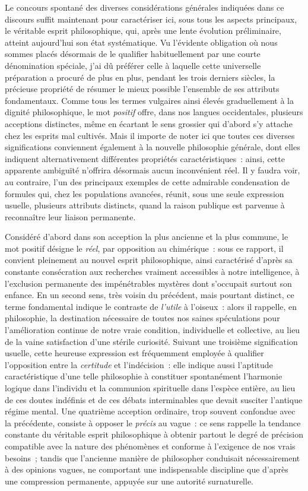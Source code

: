 \documentclass[french,twoside]{book} %
\begin{document}
Le concours spontané des diverses considérations générales indiquées dans ce discours suffit maintenant pour caractériser ici, sous tous les aspects principaux, le véritable esprit philosophique, qui, après une lente évolution préliminaire, atteint aujourd’hui son état systématique. Vu l’évidente obligation où nous sommes placés désormais de le qualifier habituellement par une courte dénomination spéciale, j’ai dû préférer celle à laquelle cette universelle préparation a procuré de plus en plus, pendant les trois derniers siècles, la précieuse propriété de résumer le mieux possible l’ensemble de ses attributs fondamentaux. Comme tous les termes vulgaires ainsi élevés graduellement à la dignité philosophique, le mot {\itshape positif} offre, dans nos langues occidentales, plusieurs acceptions distinctes, même en écartant le sens grossier qui d’abord s’y attache chez les esprits mal cultivés. Mais il importe de noter ici que toutes ces diverses significations conviennent également à la nouvelle philosophie générale, dont elles indiquent alternativement différentes propriétés caractéristiques : ainsi, cette apparente ambiguïté n’offrira désormais aucun inconvénient réel. Il y faudra voir, au contraire, l’un des principaux exemples de cette admirable condensation de formules qui, chez les populations avancées, réunit, sous une seule expression usuelle, plusieurs attributs distincts, quand la raison publique est parvenue à reconnaître leur liaison permanente.\par
Considéré d’abord dans son acception la plus ancienne et la plus commune, le mot positif désigne le {\itshape réel}, par opposition au chimérique : sous ce rapport, il convient pleinement au nouvel esprit philosophique, ainsi caractérisé d’après sa constante consécration aux recherches vraiment accessibles à notre intelligence, à l’exclusion permanente des impénétrables mystères dont s’occupait surtout son enfance. En un second sens, très voisin du précédent, mais pourtant distinct, ce terme fondamental indique le contraste de {\itshape l’utile} à l’oiseux : alors il rappelle, en philosophie, la destination nécessaire de toutes nos saines spéculations pour l’amélioration continue de notre vraie condition, individuelle et collective, au lieu de la vaine satisfaction d’une stérile curiosité. Suivant une troisième signification usuelle, cette heureuse expression est fréquemment employée à qualifier l’opposition entre la {\itshape certitude} et l’indécision : elle indique aussi l’aptitude caractéristique d’une telle philosophie à constituer spontanément l’harmonie logique dans l’individu et la communion spirituelle dans l’espèce entière, au lieu de ces doutes indéfinis et de ces débats interminables que devait susciter l’antique régime mental. Une quatrième acception ordinaire, trop souvent confondue avec la précédente, consiste à opposer le {\itshape précis} au vague : ce sens rappelle la tendance constante du véritable esprit philosophique à obtenir partout le degré de précision compatible avec la nature des phénomènes et conforme à l’exigence de nos vrais besoins ; tandis que l’ancienne manière de philosopher conduisait nécessairement à des opinions vagues, ne comportant une indispensable discipline que d’après une compression permanente, appuyée sur une autorité surnaturelle.\par
\end{document}
